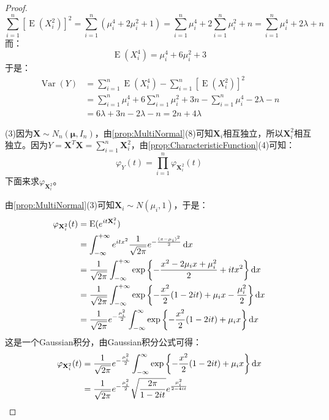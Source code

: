 \begin{proof}
\begin{equation*}
		\sum_{i=1}^{n}[\operatorname{E}(X_i^2)]^2=\sum_{i=1}^{n}(\mu_i^4+2\mu_i^2+1)=\sum_{i=1}^{n}\mu_i^4+2\sum_{i=1}^{n}\mu_i^2+n=\sum_{i=1}^{n}\mu_i^4+2\lambda+n
	\end{equation*}
	而：
	\begin{equation*}
		\operatorname{E}(X_i^4)=\mu_i^4+6\mu_i^2+3
	\end{equation*}
	于是：
	\begin{align*}
		\operatorname{Var}(Y)
		&=\sum_{i=1}^{n}\operatorname{E}(X_i^4)-\sum_{i=1}^{n}[\operatorname{E}(X_i^2)]^2 \\
		&=\sum_{i=1}^{n}\mu_i^4+6\sum_{i=1}^{n}\mu_i^2+3n-\sum_{i=1}^{n}\mu_i^4-2\lambda-n \\
		&=6\lambda+3n-2\lambda-n=2n+4\lambda
	\end{align*}\par
	(3)因为$\mathbf{X}\sim N_n(\boldsymbol{\mu},I_n)$，由\cref{prop:MultiNormal}(8)可知$\mathbf{X}_i$相互独立，所以$\mathbf{X}_i^2$相互独立。因为$Y=\mathbf{X}^T\mathbf{X}=\sum\limits_{i=1}^n\mathbf{X}_i^2$，由\cref{prop:CharacteristicFunction}(4)可知：
	\begin{equation*}
		\varphi_{Y}(t)=\prod_{i=1}^n\varphi_{\mathbf{X}_i^2}(t)
	\end{equation*}
	下面来求$\varphi_{\mathbf{X}_i^2}$。\par
	由\cref{prop:MultiNormal}(3)可知$\mathbf{X}_i\sim N(\mu_i,1)$，于是：
	\begin{align*}
		\varphi_{\mathbf{X}_i^2}(t)
		&=\operatorname{E}(e^{it\mathbf{X}_i^2}) \\
		&=\int_{-\infty}^{+\infty}e^{itx^2}\frac{1}{\sqrt{2\pi}}e^{-\frac{(x-\mu_i)^2}{2}}\mathop{}\!\mathrm{d} x \\
		&=\frac{1}{\sqrt{2\pi}}\int_{-\infty}^{+\infty}\exp\left\{-\frac{x^2 - 2\mu_ix + \mu_i^2}{2} + itx^2\right\}\mathop{}\!\mathrm{d} x \\
		&=\frac{1}{\sqrt{2\pi}}\int_{-\infty}^{+\infty}\exp\left\{-\frac{x^2}{2} (1 - 2it) + \mu_ix - \frac{\mu_i^2}{2}\right\}\mathop{}\!\mathrm{d} x \\
		&=\frac{1}{\sqrt{2\pi}}e^{-\frac{\mu_i^2}{2}} \int_{-\infty}^{\infty} \exp\left\{-\frac{x^2}{2} (1 - 2it) + \mu_ix\right\}\mathop{}\!\mathrm{d} x
	\end{align*}
	这是一个Gaussian积分，由Gaussian积分公式可得：
	\begin{align*}
		\varphi_{\mathbf{X}_i^2}(t)
		&=\frac{1}{\sqrt{2\pi}}e^{-\frac{\mu_i^2}{2}} \int_{-\infty}^{\infty}\exp\left\{-\frac{x^2}{2} (1 - 2it) + \mu_i x\right\}\dif x \\
		&=\frac{1}{\sqrt{2\pi}}e^{-\frac{\mu_i^2}{2}}\sqrt{\frac{2\pi}{1-2it}}e^{\frac{\mu_i^2}{2-4it}}

\end{align*}
\end{proof}
